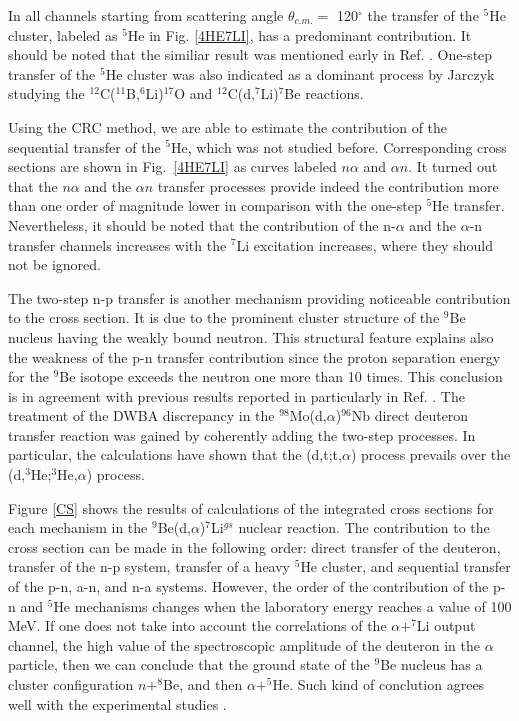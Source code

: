 \documentclass[10pt]{iopart}
\begin{document}
In all channels starting from scattering angle $\theta_{c.m.} =$ 120$^\circ$ the transfer of the ${}^5$He cluster, labeled as ${}^5$He in Fig. \ref{4HE7LI}, has a predominant contribution. 
It should be noted that the similiar result was mentioned early in Ref. \cite{bodek1989}. One-step transfer of the ${}^5$He cluster was also indicated as a dominant process by Jarczyk \etal \cite{jarczyk1996} studying the ${}^{12}$C(${}^{11}$B,${}^6$Li)${}^{17}$O and ${}^{12}$C(d,${}^7$Li)${}^{7}$Be reactions. 

Using the CRC method, we are able to estimate the contribution of the sequential transfer of the ${}^5$He, which was not studied before. 
Corresponding cross sections are shown in Fig.~\ref{4HE7LI} as curves labeled $n\alpha$ and $\alpha n$.
It turned out that the $n\alpha$ and the $\alpha n$ transfer processes provide indeed the contribution more than one order of magnitude lower in comparison with the one-step ${}^5$He transfer. 
Nevertheless, it should be noted that the contribution of the n-$\alpha$ and the $\alpha$-n transfer channels increases with the ${}^7$Li excitation increases, where they should not be ignored.

The two-step n-p transfer is another mechanism providing noticeable contribution to the cross section. 
It is due to the prominent cluster structure of the ${}^9$Be nucleus having the weakly bound neutron. 
This structural feature explains also the weakness of the p-n transfer contribution since the proton separation energy for the ${}^9$Be isotope exceeds the neutron one more than 10 times. 
This conclusion is in agreement with previous results reported in particularly in Ref. \cite{coker1974}. 
The treatment of the DWBA discrepancy in the ${}^{98}$Mo(d,$\alpha$)${}^{96}$Nb direct deuteron transfer reaction was gained by coherently adding the two-step processes. 
In particular, the calculations have shown that the (d,t;t,$\alpha$) process prevails over the (d,${}^3$He;${}^3$He,$\alpha$) process.

Figure \ref{CS} shows the results of calculations of the integrated cross sections for each mechanism in the ${}^9$Be(d,$\alpha$)${}^7$Li$^{gs}$ nuclear reaction. 
The contribution to the cross section can be made in the following order: direct transfer of the deuteron, transfer of the n-p system, transfer of a heavy ${}^5$He cluster,  and sequential transfer of the p-n, a-n, and n-a systems. 
However, the order of the contribution of the p-n and ${}^5$He mechanisms changes when the laboratory energy reaches a value of 100 MeV.
If one does not take into account the correlations of the $\alpha+^7$Li output channel, the high value of the spectroscopic amplitude of the deuteron in the $\alpha$ particle, then we can conclude that the ground state of the $^9$Be nucleus has a cluster configuration $n+^8$Be, and then $\alpha+^5$He. Such kind of conclution agrees well with the experimental studies \cite{brown2007, papka2007}.
\end{document}
